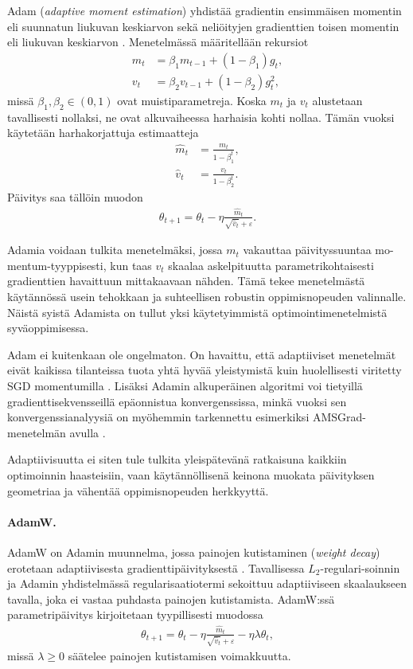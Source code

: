 Adam (\emph{adaptive moment estimation}) yhdistää gradientin ensimmäisen momentin eli suunnatun liukuvan keskiarvon sekä neliöityjen gradienttien toisen momentin eli liukuvan keskiarvon \cite{kingma2015adam}. Menetelmässä määritellään rekursiot
\begin{align*}
  m_t
  &=
  \beta_1m_{t-1}+(1-\beta_1)g_t, \\
  v_t
  &=
  \beta_2v_{t-1}+(1-\beta_2)g_t^2,
\end{align*}
missä \(\beta_1,\beta_2\in(0,1)\) ovat muistiparametreja. Koska \(m_t\)
ja \(v_t\) alustetaan tavallisesti nollaksi, ne ovat alkuvaiheessa
harhaisia kohti nollaa. Tämän vuoksi käytetään harhakorjattuja estimaatteja
\begin{align*}
  \hat{m}_t
  &=
  \frac{m_t}{1-\beta_1^t}, \\
  \hat{v}_t
  &=
  \frac{v_t}{1-\beta_2^t}.
\end{align*}
Päivitys saa tällöin muodon
\begin{align*}
  \theta_{t+1}
  =
  \theta_t
  -
  \eta
  \frac{\hat{m}_t}{\sqrt{\hat{v}_t}+\varepsilon}.
\end{align*}

Adamia voidaan tulkita menetelmäksi, jossa \(m_t\) vakauttaa
päivityssuuntaa mo-mentum-tyyppisesti, kun taas \(v_t\) skaalaa
askelpituutta parametrikohtaisesti gradienttien havaittuun mittakaavaan
nähden. Tämä tekee menetelmästä käytännössä usein tehokkaan ja
suhteellisen robustin oppimisnopeuden valinnalle. Näistä syistä Adamista
on tullut yksi käytetyimmistä optimointimenetelmistä syväoppimisessa.

Adam ei kuitenkaan ole ongelmaton. On havaittu, että adaptiiviset
menetelmät eivät kaikissa tilanteissa tuota yhtä hyvää yleistymistä kuin
huolellisesti viritetty SGD momentumilla \cite{wilson2017marginal}. Lisäksi Adamin alkuperäinen algoritmi voi tietyillä gradienttisekvensseillä epäonnistua konvergenssissa, minkä vuoksi sen konvergenssianalyysiä on myöhemmin tarkennettu esimerkiksi AMSGrad-menetelmän avulla \cite{reddi2018convergence}.

Adaptiivisuutta ei siten
tule tulkita yleispätevänä ratkaisuna kaikkiin optimoinnin haasteisiin,
vaan käytännöllisenä keinona muokata päivityksen geometriaa ja vähentää
oppimisnopeuden herkkyyttä.

\paragraph{AdamW.}

AdamW on Adamin muunnelma, jossa painojen kutistaminen
(\emph{weight decay}) erotetaan adaptiivisesta gradienttipäivityksestä
\cite{loshchilov2019decoupled}. Tavallisessa \(L_2\)-regulari-soinnin ja
Adamin yhdistelmässä regularisaatiotermi sekoittuu adaptiiviseen
skaalaukseen tavalla, joka ei vastaa puhdasta painojen kutistamista.
AdamW:ssä parametripäivitys kirjoitetaan tyypillisesti muodossa
\begin{align*}
  \theta_{t+1}
  =
  \theta_t
  -
  \eta
  \frac{\hat{m}_t}{\sqrt{\hat{v}_t}+\varepsilon}
  -
  \eta\lambda\theta_t,
\end{align*}
missä \(\lambda\ge0\) säätelee painojen kutistamisen voimakkuutta.

